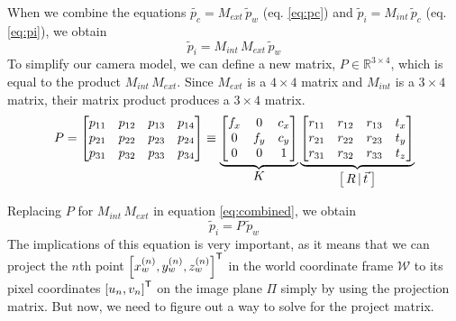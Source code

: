 When we combine the equations $\widetilde{p_c} = M_{ext}\,\widetilde{p}_w$ (eq. \ref{eq:pc}) and $\widetilde{p}_i = M_{int}\,\widetilde{p}_c$ (eq. \ref{eq:pi}), we obtain
\begin{equation} \label{eq:combined}
    \widetilde{p}_{i} = M_{int}\,M_{ext}\,\widetilde{p}_{w}
\end{equation}
To simplify our camera model, we can define a new matrix, $P \in \mathbb{R}^{3 \times 4}$, which is equal to the product $M_{int}\,M_{ext}$. Since $M_{ext}$ is a $4 \times 4$ matrix and $M_{int}$ is a $3 \times 4$ matrix, their matrix product produces a $3 \times 4$ matrix.
\begin{equation}
    P=
    \begin{bmatrix}
        p_{11} & p_{12} & p_{13} & p_{14} \\
        p_{21} & p_{22} & p_{23} & p_{24} \\
        p_{31} & p_{32} & p_{33} & p_{34}
    \end{bmatrix}
    \equiv
    \underbrace{
        \begin{bmatrix}
            f_x & 0   & c_x \\
            0   & f_y & c_y \\
            0   & 0   & 1
        \end{bmatrix}
    }_{\mathlarger{K}}
    \underbrace{
        \begin{bmatrix}
            r_{11} & r_{12} & r_{13} & t_x \\
            r_{21} & r_{22} & r_{23} & t_y \\
            r_{31} & r_{32} & r_{33} & t_z \\
        \end{bmatrix}
    }_{\mathlarger{\left[\,R\,\vert\,\vec{t}\:\right]}}
\end{equation}

Replacing $P$ for $M_{int}\,M_{ext}$ in equation \ref{eq:combined}, we obtain
\begin{equation} \label{eq:project}
    \widetilde{p}_{i} = P\,\widetilde{p}_{w}
\end{equation}
The implications of this equation is very important, as it means that we can project the $n$th point $\left[ x_w^{(n)}, y_w^{(n)}, z_w^{(n)} \right]^{\mathsf{T}}$ in the world coordinate frame $\mathcal{W}$ to its pixel coordinates $\left[ u_n, v_n \right]^{\mathsf{T}}$ on the image plane $\Pi$ simply by using the projection matrix. But now, we need to figure out a way to solve for the project matrix.

